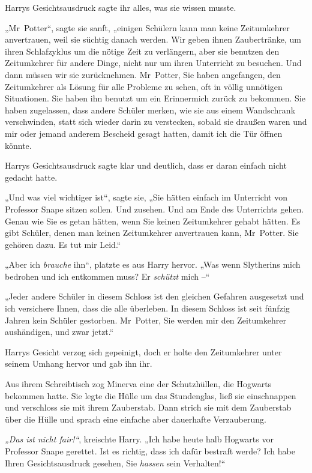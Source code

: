 Harrys Gesichtsausdruck sagte ihr alles, was sie wissen musste. 

„Mr~Potter“, sagte sie sanft, „einigen Schülern kann man keine Zeitumkehrer anvertrauen, weil sie süchtig danach werden. Wir geben ihnen Zaubertränke, um ihren Schlafzyklus um die nötige Zeit zu verlängern, aber sie benutzen den Zeitumkehrer für andere Dinge, nicht nur um ihren Unterricht zu besuchen. Und dann müssen wir sie zurücknehmen. Mr~Potter, Sie haben angefangen, den Zeitumkehrer als Lösung für alle Probleme zu sehen, oft in völlig unnötigen Situationen. Sie haben ihn benutzt um ein Erinnermich zurück zu bekommen. Sie haben zugelassen, dass andere Schüler merken, wie sie aus einem Wandschrank verschwinden, statt sich wieder darin zu verstecken, sobald sie draußen waren und mir oder jemand anderem Bescheid gesagt hatten, damit ich die Tür öffnen könnte. 

Harrys Gesichtsausdruck sagte klar und deutlich, dass er daran einfach nicht gedacht hatte. 

„Und was viel wichtiger ist“, sagte sie, „Sie hätten einfach im Unterricht von Professor Snape sitzen sollen. Und zusehen. Und am Ende des Unterrichts gehen. Genau wie Sie es getan hätten, wenn Sie keinen Zeitumkehrer gehabt hätten. Es gibt Schüler, denen man keinen Zeitumkehrer anvertrauen kann, Mr~Potter. Sie gehören dazu. Es tut mir Leid.“ 

„Aber ich \emph{brauche} ihn“, platzte es aus Harry hervor. „Was wenn Slytherins mich bedrohen und ich entkommen muss? Er \emph{schützt} mich –“ 

„Jeder andere Schüler in diesem Schloss ist den gleichen Gefahren ausgesetzt und ich versichere Ihnen, dass die alle überleben. In diesem Schloss ist seit fünfzig Jahren kein Schüler gestorben. Mr~Potter, Sie werden mir den Zeitumkehrer aushändigen, und zwar jetzt.“ 

Harrys Gesicht verzog sich gepeinigt, doch er holte den Zeitumkehrer unter seinem Umhang hervor und gab ihn ihr. 

Aus ihrem Schreibtisch zog Minerva eine der Schutzhüllen, die Hogwarts bekommen hatte. Sie legte die Hülle um das Stundenglas, ließ sie einschnappen und verschloss sie mit ihrem Zauberstab. Dann strich sie mit dem Zauberstab über die Hülle und sprach eine einfache aber dauerhafte Verzauberung. 

\emph{„Das ist nicht fair!“}, kreischte Harry. „Ich habe heute halb Hogwarts vor Professor Snape gerettet. Ist es richtig, dass ich dafür bestraft werde? Ich habe Ihren Gesichtsausdruck gesehen, Sie \emph{hassen} sein Verhalten!“ 

